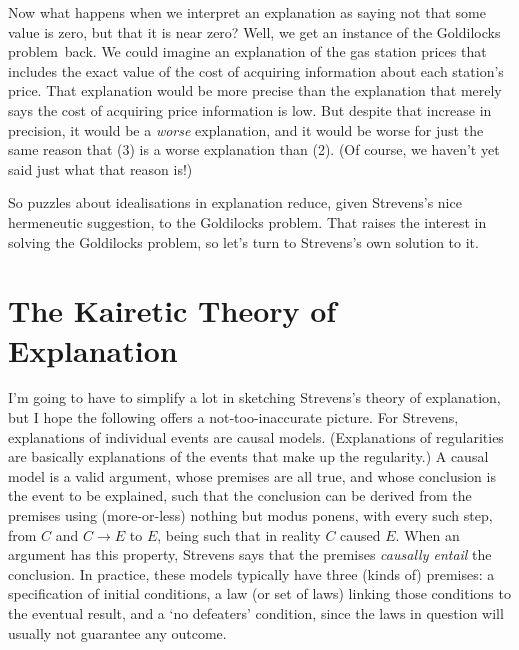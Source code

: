 \documentclass[
  11pt,
  letterpaper,
  DIV=11,
  numbers=noendperiod,
  oneside]{scrartcl}
\begin{document}
Now what happens when we interpret an explanation as saying not that
some value is zero, but that it is near zero? Well, we get an instance
of the Goldilocks problem~back. We could imagine an explanation of the
gas station prices that includes the exact value of the cost of
acquiring information about each station's price. That explanation would
be more precise than the explanation that merely says the cost of
acquiring price information is low. But despite that increase in
precision, it would be a \emph{worse} explanation, and it would be worse
for just the same reason that (3) is a worse explanation than (2). (Of
course, we haven't yet said just what that reason is!)

So puzzles about idealisations in explanation reduce, given Strevens's
nice hermeneutic suggestion, to the Goldilocks problem. That raises the
interest in solving the Goldilocks problem, so let's turn to Strevens's
own solution to it.

\section{The Kairetic Theory of
Explanation}\label{the-kairetic-theory-of-explanation}

I'm going to have to simplify a lot in sketching Strevens's theory of
explanation, but I hope the following offers a not-too-inaccurate
picture. For Strevens, explanations of individual events are causal
models. (Explanations of regularities are basically explanations of the
events that make up the regularity.) A causal model is a valid argument,
whose premises are all true, and whose conclusion is the event to be
explained, such that the conclusion can be derived from the premises
using (more-or-less) nothing but modus ponens, with every such step,
from \(C\) and \(C \rightarrow E\) to \(E\), being such that in reality
\(C\) caused \(E\). When an argument has this property, Strevens says
that the premises \emph{causally entail} the conclusion. In practice,
these models typically have three (kinds of) premises: a specification
of initial conditions, a law (or set of laws) linking those conditions
to the eventual result, and a `no defeaters' condition, since the laws
in question will usually not guarantee any outcome.
\end{document}

